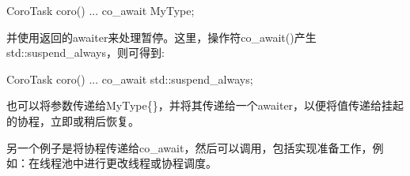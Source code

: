 \begin{cpp}
CoroTask coro()
{
	...
	co_await MyType{};
}
\end{cpp}

并使用返回的awaiter来处理暂停。这里，操作符co\_await()产生std::suspend\_always{}，则可得到:

\begin{cpp}
CoroTask coro()
{
	...
	co_await std::suspend_always{};
}
\end{cpp}

也可以将参数传递给MyType\{\}，并将其传递给一个awaiter，以便将值传递给挂起的协程，立即或稍后恢复。

另一个例子是将协程传递给co\_await，然后可以调用，包括实现准备工作，例如：在线程池中进行更改线程或协程调度。













